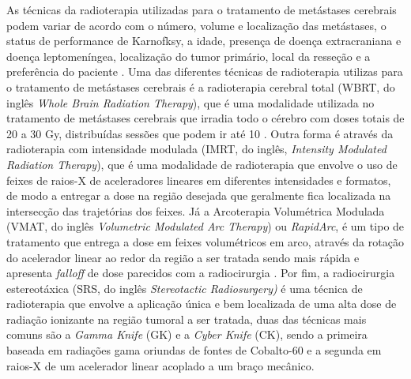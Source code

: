 As técnicas da radioterapia utilizadas para o tratamento de metástases cerebrais podem variar de acordo com o número, volume e localização das metástases, o status de performance de Karnofksy, a idade, presença de doença extracraniana e doença leptomeníngea, localização do tumor primário, local da resseção e a preferência do paciente \cite{Arora:2023}. Uma das diferentes técnicas de radioterapia utilizas para o tratamento de metástases cerebrais é a radioterapia cerebral total (WBRT, do inglês \textit{Whole Brain Radiation Therapy}), que é uma modalidade utilizada no tratamento de metástases cerebrais que irradia todo o cérebro com doses totais de 20 a 30 Gy, distribuídas sessões que podem ir até 10 \cite{Desai:2020,Arora:2023}. Outra forma é através da radioterapia com intensidade modulada (IMRT, do inglês, \textit{Intensity Modulated Radiation Therapy}), que é uma modalidade de radioterapia que envolve o uso de feixes de raios-X de aceleradores lineares em diferentes intensidades e formatos, de modo a entregar a dose na região desejada que geralmente fica localizada na intersecção das trajetórias dos feixes. Já a Arcoterapia Volumétrica Modulada (VMAT, do inglês \textit{Volumetric Modulated Arc Therapy}) ou \textit{RapidArc}, é um tipo de  tratamento que entrega a dose em feixes volumétricos em arco, através da rotação do acelerador linear ao redor da região a ser tratada sendo mais rápida e apresenta \textit{falloff} de dose parecidos com a radiocirurgia \cite{Ballangrud:2018}. Por fim, a radiocirurgia estereotáxica (SRS, do inglês \textit{Stereotactic Radiosurgery)} é uma técnica de radioterapia que envolve a aplicação única e bem localizada de uma alta dose de radiação ionizante na região tumoral a ser tratada, duas das técnicas mais comuns são a \textit{Gamma Knife} (GK) e a \textit{Cyber Knife} (CK), sendo a primeira baseada em radiações gama oriundas de fontes de Cobalto-60 e a segunda em raios-X de um acelerador linear acoplado a um braço mecânico.

